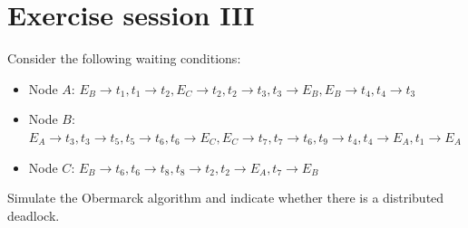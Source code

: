 \documentclass[12pt, a4paper]{report}
\newtheorem[style=M,bodystyle=\normalfont]{theorem}{Theorem}
\newtheorem[style=M,bodystyle=\normalfont]{corollary}{Corollary}
\newtheorem[style=M,bodystyle=\normalfont]{lemma}{Lemma}
\newtheorem[style=M,bodystyle=\normalfont]{definition}{Definition}
\begin{document}
\chapter{Exercise session III}
\begin{Exercise}[label=13]
    Consider the following waiting conditions:
    \begin{itemize}
        \item Node $A$: $E_B \rightarrow t_1, t_1 \rightarrow t_2, E_C \rightarrow t_2, t_2 \rightarrow t_3, t_3 \rightarrow E_B, E_B \rightarrow t_4, t_4 \rightarrow t_3$
        \item Node $B$: $E_A \rightarrow t_3, t_3 \rightarrow t_5, t_5 \rightarrow t_6, t_6 \rightarrow E_C, E_C \rightarrow t_7, t_7 \rightarrow t_6, t_9 \rightarrow t_4,t_4 \rightarrow E_A, t_1 \rightarrow E_A$
        \item Node $C$: $E_B \rightarrow t_6, t_6 \rightarrow t_8, t_8 \rightarrow t_2, t_2 \rightarrow E_A, t_7 \rightarrow E_B$
    \end{itemize}
    Simulate the Obermarck algorithm and indicate whether there is a distributed deadlock.
\end{Exercise}
\end{document}
